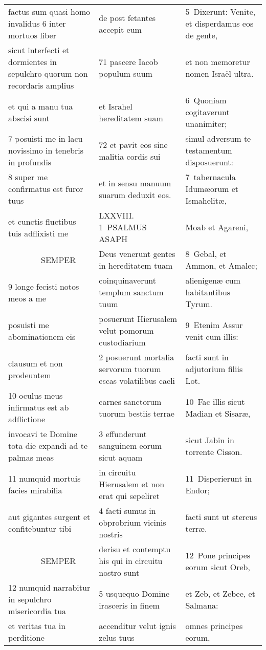 \documentclass{article}
\begin{document}
\begin{longtable}{@{}p{}p{}p{}@{}}
factus sum quasi homo invalidus 6 inter mortuos liber	&	de post fetantes accepit eum	&	5 Dixerunt: Venite, et disperdamus eos de gente,	\\
sicut interfecti et dormientes in sepulchro quorum non recordaris amplius	&	71 pascere Iacob populum suum	&	et non memoretur nomen Israël ultra.	\\
et qui a manu tua abscisi sunt	&	et Israhel hereditatem suam	&	6 Quoniam cogitaverunt unanimiter;	\\
7 posuisti me in lacu novissimo in tenebris in profundis	&	72 et pavit eos sine malitia cordis sui	&	simul adversum te testamentum disposuerunt:	\\
8 super me confirmatus est furor tuus	&	et in sensu manuum suarum deduxit eos.	&	7 tabernacula Idumæorum et Ismahelitæ,	\\
et cunctis fluctibus tuis adflixisti me	&	LXXVIII. 1 PSALMUS ASAPH	&	Moab et Agareni,	\\
    SEMPER	&	Deus venerunt gentes in hereditatem tuam	&	8 Gebal, et Ammon, et Amalec;	\\
9 longe fecisti notos meos a me	&	coinquinaverunt templum sanctum tuum	&	alienigenæ cum habitantibus Tyrum.	\\
posuisti me abominationem eis	&	posuerunt Hierusalem velut pomorum custodiarium	&	9 Etenim Assur venit cum illis:	\\
clausum et non prodeuntem	&	2 posuerunt mortalia servorum tuorum escas volatilibus caeli	&	facti sunt in adjutorium filiis Lot.	\\
10 oculus meus infirmatus est ab adflictione	&	carnes sanctorum tuorum bestiis terrae	&	10 Fac illis sicut Madian et Sisaræ,	\\
invocavi te Domine tota die expandi ad te palmas meas	&	3 effunderunt sanguinem eorum sicut aquam	&	sicut Jabin in torrente Cisson.	\\
11 numquid mortuis facies mirabilia	&	in circuitu Hierusalem et non erat qui sepeliret	&	11 Disperierunt in Endor;	\\
aut gigantes surgent et confitebuntur tibi	&	4 facti sumus in obprobrium vicinis nostris	&	facti sunt ut stercus terræ.	\\
    SEMPER	&	derisu et contemptu his qui in circuitu nostro sunt	&	12 Pone principes eorum sicut Oreb,	\\
12 numquid narrabitur in sepulchro misericordia tua	&	5 usquequo Domine irasceris in finem	&	et Zeb, et Zebee, et Salmana:	\\
et veritas tua in perditione	&	accenditur velut ignis zelus tuus	&	omnes principes eorum,	\\

\end{longtable}
\end{document}
